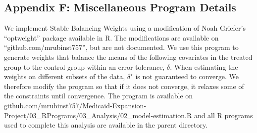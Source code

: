 \documentclass[12pt]{article}
\begin{document}
\subsection{Appendix F: Miscellaneous Program Details}

We implement Stable Balancing Weights using a modification of Noah Griefer's ``optweight'' package available in R. The modifications are available on ``github.com/mrubinst757'', but are not documented. We use this program to generate weights that balance the means of the following covariates in the treated group to the control group within an error tolerance, $\delta$. When estimating the weights on different subsets of the data, $\delta^\star$ is not guaranteed to converge. We therefore modify the program so that if it does not converge, it relaxes some of the constraints until convergence. The program is available on github.com/mrubinst757/Medicaid-Expansion-Project/03\_RPrograms/03\_Analysis/02\_model-estimation.R and all R programs used to complete this analysis are available in the parent directory.
\end{document}
